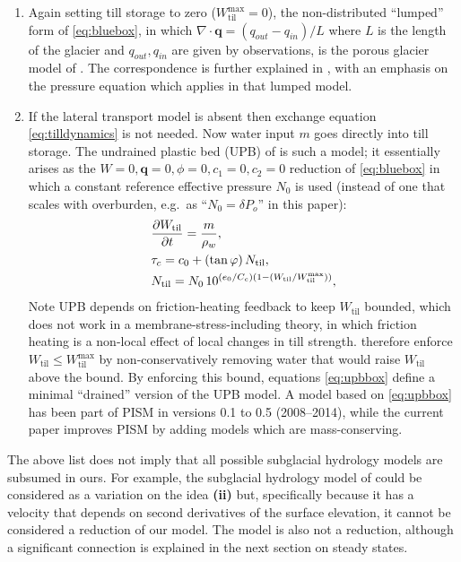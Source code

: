 \documentclass[gmd]{copernicus}   %
\newcommand{\text}{\textrm}
\newcommand\bq{\mathbf{q}}
\newcommand{\ddt}[1]{\ensuremath{\frac{\partial #1}{\partial t}}}
\newcommand{\Div}{\nabla\cdot}
\newcommand{\Wtil}{W_{\text{til}}}
\newcommand{\Wtilmax}{W_{\text{til}}^{\text{max}}}
\begin{document}
\begin{enumerate}
\item Again setting till storage to zero ($\Wtilmax=0$), the non-distributed ``lumped'' form of \eqref{eq:bluebox}, in which $\Div \bq = (q_{out} - q_{in})/L$ where $L$ is the length of the glacier and $q_{out},q_{in}$ are given by observations, is the porous glacier model of \cite{Bartholomausetal2011}.  The correspondence is further explained in \cite{Bueler2014correspondence}, with an emphasis on the pressure equation which applies in that lumped model.

\item If the lateral transport model is absent then exchange equation \eqref{eq:tilldynamics} is not needed.  Now water input $m$ goes directly into till storage.  The undrained plastic bed (UPB) of \cite{Tulaczyketal2000b} is such a model; it essentially arises as the $W=0,\bq=0,\phi=0,c_1=0,c_2=0$ reduction of \eqref{eq:bluebox} in which a constant reference effective pressure $N_0$ is used (instead of one that scales with overburden, e.g.~as ``$N_0=\delta P_o$'' in this paper):
\begin{align}
&\ddt{\Wtil} = \frac{m}{\rho_w}, \label{eq:upbbox} \\
&\tau_c = c_0 + (\tan \varphi)\, \Ntil, \notag \\
&\Ntil = N_0\, 10^{(e_0/C_c) \left(1 - (\Wtil/\Wtilmax)\right)}, \notag
\end{align}
Note UPB depends on friction-heating feedback to keep $\Wtil$ bounded, which does not work in a membrane-stress-including theory, in which friction heating is a non-local effect of local changes in till strength.  \cite{BBssasliding} therefore enforce $\Wtil \le \Wtilmax$ by non-conservatively removing water that would raise $\Wtil$ above the bound.  By enforcing this bound, equations \eqref{eq:upbbox} define a minimal ``drained'' version of the UPB model.  A model based on \eqref{eq:upbbox} has been part of PISM in versions 0.1 to 0.5 (2008--2014), while the current paper improves PISM by adding models which are mass-conserving.
\end{enumerate}

The above list does not imply that all possible subglacial hydrology models are subsumed in ours.  For example, the subglacial hydrology model of \cite{JohnsonFastook} could be considered as a variation on the idea \textbf{(ii)} but, specifically because it has a velocity that depends on second derivatives of the surface elevation, it cannot be considered a reduction of our model.  The \cite{FlowersClarke2002_theory} model is also not a reduction, although a significant connection is explained in the next section on steady states.
\end{document}
